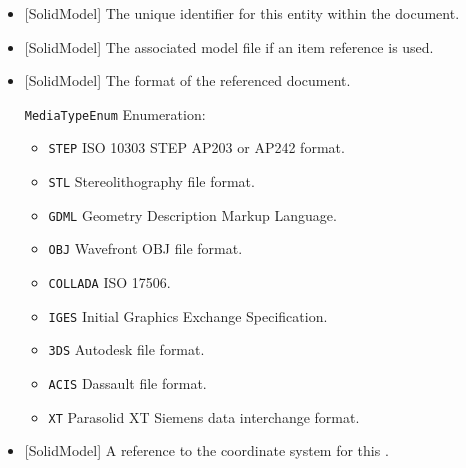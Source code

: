 \begin{itemize}

\item {}[SolidModel] \newline The unique identifier for this entity within the  document.

\item {}[SolidModel] \newline The associated model file if an item reference is used.

\item {}[SolidModel] \newline The format of the referenced document.

\texttt{MediaTypeEnum} Enumeration:

\begin{itemize}
\item \texttt{STEP} \newline ISO 10303 STEP AP203 or AP242 format. 
\item \texttt{STL} \newline Stereolithography file format. 
\item \texttt{GDML} \newline Geometry Description Markup Language. 
\item \texttt{OBJ} \newline Wavefront OBJ file format.
 
\item \texttt{COLLADA} \newline ISO 17506. 
\item \texttt{IGES} \newline Initial Graphics Exchange Specification. 
\item \texttt{3DS} \newline Autodesk file format. 
\item \texttt{ACIS} \newline Dassault file format. 
\item \texttt{X\textunderscore T} \newline Parasolid XT Siemens data interchange format. 
\end{itemize}


\item {}[SolidModel] \newline A reference to the coordinate system for this .

\end{itemize}


